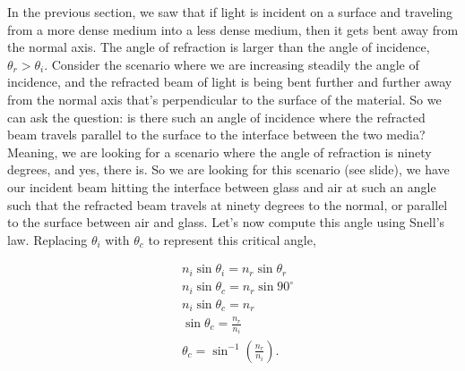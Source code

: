 In the previous section, we saw that if light is incident on a surface and traveling from a more dense medium into a less dense medium, then it gets bent away from the normal axis. The angle of refraction is larger than the angle of incidence, $\theta_r > \theta_i$. Consider the scenario where we are increasing steadily the angle of incidence, and the refracted beam of light is being bent further and further away from the normal axis that's perpendicular to the surface of the material. So we can ask the question: is there such an angle of incidence where the refracted beam travels parallel to the surface to the interface between the two media? Meaning, we are looking for a scenario where the angle of refraction is ninety degrees, and yes, there is. So we are looking for this scenario (see slide), we have our incident beam hitting the interface between glass and air at such an angle such that the refracted beam travels at ninety degrees to the normal, or parallel to the surface between air and glass. Let's now compute this angle using Snell's law.  Replacing $\theta_i$ with $\theta_c$ to represent this critical angle,

\begin{equation}
\begin{aligned}
&n_i \sin \theta_i=n_r \sin \theta_r \\
&n_i \sin \theta_c=n_r \sin 90^{\circ} \\
&n_i \sin \theta_c=n_r \\
&\sin \theta_c=\frac{n_r}{n_i} \\
&\theta_c=\sin ^{-1}\left(\frac{n_r}{n_i}\right).
\end{aligned}
\end{equation}


